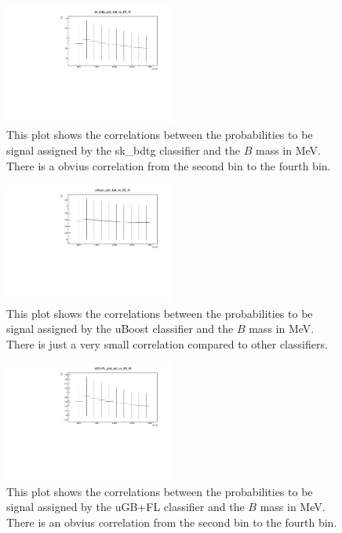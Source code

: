 \documentclass[english]{uzhpub}
\begin{document}
 \begin{figure}[H]
  \centering
  \includegraphics[width=0.5\textwidth]{plots/sk_bdtg_plot_bdt_vs_B0_M}
  \caption{This plot shows the correlations between the probabilities to be signal assigned by the sk\_bdtg classifier and the $B$ mass in MeV. There is a obvius correlation from the second bin to the fourth bin.}
  \label{fig:skbdtgB0M}
 \end{figure}

 \begin{figure}[H]
  \centering
  \includegraphics[width=0.5\textwidth]{plots/uBoost_plot_bdt_vs_B0_M}
  \caption{This plot shows the correlations between the probabilities to be signal assigned by the uBoost classifier and the $B$ mass in MeV. There is just a very small correlation compared to other classifiers.}
  \label{fig:uBoostB0M}
 \end{figure}

 \begin{figure}[H]
  \centering
  \includegraphics[width=0.5\textwidth]{plots/uGB+FL_plot_bdt_vs_B0_M}
  \caption{This plot shows the correlations between the probabilities to be signal assigned by the uGB+FL classifier and the $B$ mass in MeV. There is an obvius correlation from the second bin to the fourth bin.}
  \label{fig:uGB+FLB0M}
 \end{figure}
\end{document}
